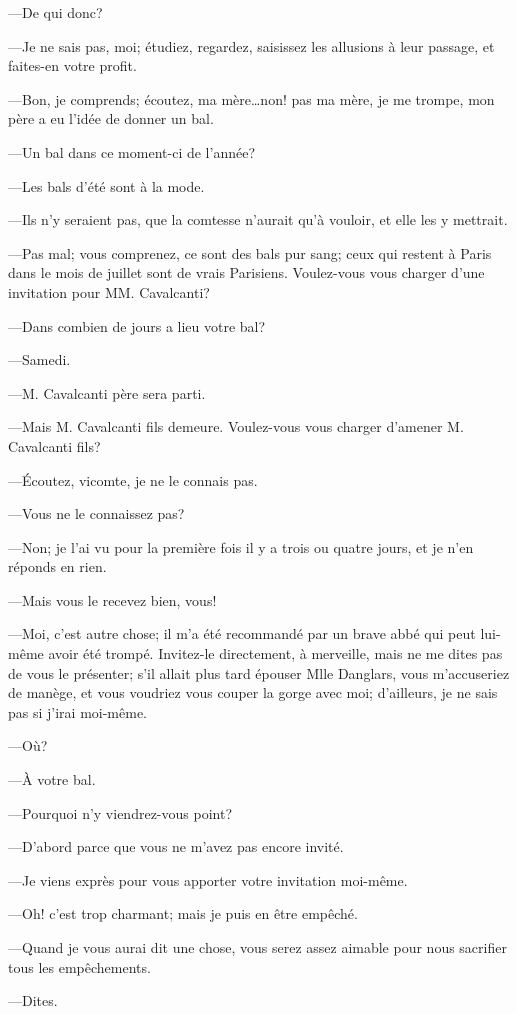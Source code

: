 —De qui donc?  

—Je ne sais pas, moi; étudiez, regardez, saisissez les allusions à leur passage, et faites-en votre profit. 

—Bon, je comprends; écoutez, ma mère\dots non! pas ma mère, je me trompe, mon père a eu l'idée de donner un bal. 

—Un bal dans ce moment-ci de l'année? 

—Les bals d'été sont à la mode. 

—Ils n'y seraient pas, que la comtesse n'aurait qu'à vouloir, et elle les y mettrait. 

—Pas mal; vous comprenez, ce sont des bals pur sang; ceux qui restent à Paris dans le mois de juillet sont de vrais Parisiens. Voulez-vous vous charger d'une invitation pour MM. Cavalcanti? 

—Dans combien de jours a lieu votre bal? 

—Samedi. 

—M. Cavalcanti père sera parti. 

—Mais M. Cavalcanti fils demeure. Voulez-vous vous charger d'amener M. Cavalcanti fils? 

—Écoutez, vicomte, je ne le connais pas. 

—Vous ne le connaissez pas? 

—Non; je l'ai vu pour la première fois il y a trois ou quatre jours, et je n'en réponds en rien. 

—Mais vous le recevez bien, vous! 

—Moi, c'est autre chose; il m'a été recommandé par un brave abbé qui peut lui-même avoir été trompé. Invitez-le directement, à merveille, mais ne me dites pas de vous le présenter; s'il allait plus tard épouser Mlle Danglars, vous m'accuseriez de manège, et vous voudriez vous couper la gorge avec moi; d'ailleurs, je ne sais pas si j'irai moi-même. 

—Où? 

—À votre bal. 

—Pourquoi n'y viendrez-vous point? 

—D'abord parce que vous ne m'avez pas encore invité. 

—Je viens exprès pour vous apporter votre invitation moi-même. 

—Oh! c'est trop charmant; mais je puis en être empêché. 

—Quand je vous aurai dit une chose, vous serez assez aimable pour nous sacrifier tous les empêchements. 

—Dites. 

